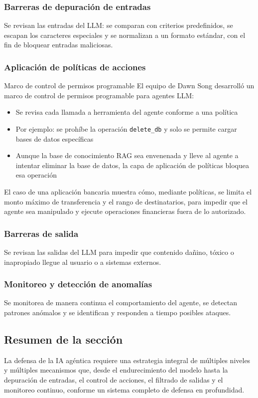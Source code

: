 \subsubsection{Barreras de depuración de entradas}

Se revisan las entradas del LLM: se comparan con criterios predefinidos, se escapan los caracteres especiales y se normalizan a un formato estándar, con el fin de bloquear entradas maliciosas.

\subsubsection{Aplicación de políticas de acciones}

\begin{importantbox}{Marco de control de permisos programable}
El equipo de Dawn Song desarrolló un marco de control de permisos programable para agentes LLM:
\begin{itemize}
    \item Se revisa cada llamada a herramienta del agente conforme a una política
    \item Por ejemplo: se prohíbe la operación \texttt{delete\_db} y solo se permite cargar bases de datos específicas
    \item Aunque la base de conocimiento RAG sea envenenada y lleve al agente a intentar eliminar la base de datos, la capa de aplicación de políticas bloquea esa operación
\end{itemize}
\end{importantbox}

El caso de una aplicación bancaria muestra cómo, mediante políticas, se limita el monto máximo de transferencia y el rango de destinatarios, para impedir que el agente sea manipulado y ejecute operaciones financieras fuera de lo autorizado.

\subsubsection{Barreras de salida}

Se revisan las salidas del LLM para impedir que contenido dañino, tóxico o inapropiado llegue al usuario o a sistemas externos.

\subsubsection{Monitoreo y detección de anomalías}

Se monitorea de manera continua el comportamiento del agente, se detectan patrones anómalos y se identifican y responden a tiempo posibles ataques.

\subsection{Resumen de la sección}

La defensa de la IA agéntica requiere una estrategia integral de múltiples niveles y múltiples mecanismos que, desde el endurecimiento del modelo hasta la depuración de entradas, el control de acciones, el filtrado de salidas y el monitoreo continuo, conforme un sistema completo de defensa en profundidad.


